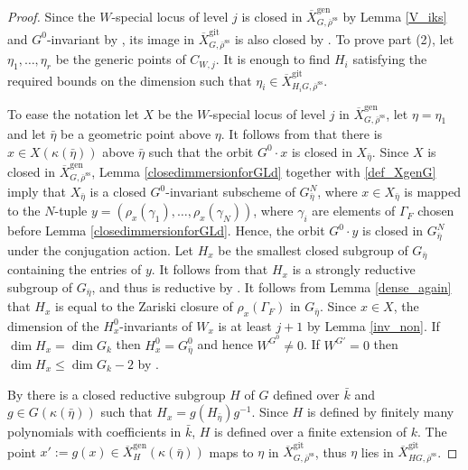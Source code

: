 \documentclass{amsart}
\theoremstyle{definition}
\theoremstyle{remark}
\newcommand{\rhobar}{\overline{\rho}}
\newcommand{\gen}{\mathrm{gen}}
\newcommand{\gps}{\mathrm{git}}
\newcommand{\Xbar}{\overline{X}}
\newcommand{\XbargenH}{\overline{X}^{\gen}_H}
\newcommand{\etabar}{\bar{\eta}}
\newcommand{\rhobarss}{\rhobar^{\mathrm{ss}}}
\begin{document}
\begin{proof} 
Since the $W$-special locus of level $j$ is closed in $\Xbar^{\gen}_{G, \rhobarss}$ by Lemma \ref{V_iks} and $G^0$-invariant by , 
its image in $\Xbar^{\gps}_{G,\rhobarss}$ is also closed by \cite[Theorem 3 (iii)]{seshadri}. 
To prove part (2),  let $\eta_1, \ldots, \eta_r$ be the 
generic points of $C_{W,j}$. It is enough to find $H_i$ satisfying the required bounds on the
dimension such that $\eta_i \in \Xbar^{\gps}_{H_iG, \rhobarss}$. 

To ease the notation let $X$ be the $W$-special locus of level $j$ in $\Xbar^{\gen}_{G, \rhobarss}$, let $\eta=\eta_1$ and let $\bar{\eta}$ be a geometric point above $\eta$. It follows from 
\cite[Theorem 3]{seshadri} that there is $x\in X(\kappa(\bar{\eta}))$ above $\bar{\eta}$ such that the 
orbit $G^0 \cdot x$ is closed in $X_{\bar{\eta}}$. Since $X$ is closed in $\Xbar^{\gen}_{G, \rhobarss}$, Lemma \ref{closedimmersionforGLd} together with \eqref{def_XgenG}
imply that $X_{\bar{\eta}}$ is a closed $G^0$-invariant subscheme of $G^N_{\bar{\eta}}$, where $x\in X_{\bar{\eta}}$ 
is mapped to the $N$-tuple $y=(\rho_x(\gamma_1), \ldots, \rho_x(\gamma_N))$, where $\gamma_i$ are elements of $\Gamma_F$ chosen before Lemma \ref{closedimmersionforGLd}. 
Hence, the orbit $G^0 \cdot y$ is closed in $G^N_{\bar{\eta}}$ under the conjugation action. Let $H_x$ be the smallest closed subgroup 
of $G_{\bar{\eta}}$ containing the entries of $y$. It follows from \cite[Theorem 3.1]{BMR} that $H_x$ is a strongly reductive subgroup of $G_{\bar{\eta}}$, and thus 
is reductive by \cite[Section 6]{martin}. It follows from Lemma \ref{dense_again} that  $H_x$ is equal to the Zariski closure of $\rho_x(\Gamma_F)$ in $G_{\bar{\eta}}$. Since $x\in X$, the dimension of the $H_x^0$-invariants
of $W_x$ is at least $j+1$ by Lemma \ref{inv_non}. If $\dim H_x= \dim G_k$ then $H_x^0= G_{\etabar}^0$ and hence 
$W^{G^0}\neq 0$. If $W^{G'}=0$ then $\dim H_x \le \dim G_k - 2$ by .

By \cite[Theorem 10.3]{martin} there is a closed reductive 
subgroup $H$ of $G$ defined over $\bar{k}$ and $g\in G(\kappa(\etabar))$ such that $H_x= g (H_{\etabar}) g^{-1}$. Since $H$ is defined by finitely many polynomials with coefficients in $\bar{k}$, $H$ is 
defined over a finite extension of $k$. The point $x':= g(x)\in \XbargenH(\kappa(\etabar))$ maps to $\eta$ in $\Xbar^{\gps}_{G, \rhobarss}$, thus $\eta$ lies in $\Xbar^{\gps}_{HG, \rhobarss}$. 
\end{proof}
\end{document}
